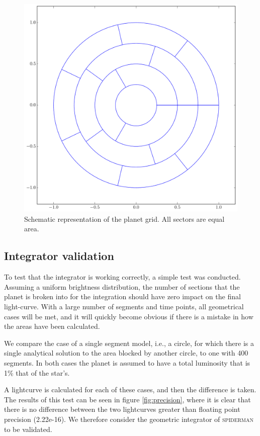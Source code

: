 \documentclass[a4paper,fleqn,usenatbib]{mnras}
\begin{document}
\begin{figure}
\begin{center}
\includegraphics[width=0.8\columnwidth]{img/frame1.pdf}
\caption{Schematic representation of the planet grid. All sectors are equal area.}
\label{fig:schematic}
\end{center}
\end{figure}

\subsection{Integrator validation}\label{sec:numerical}

To test that the integrator is working correctly, a simple test was conducted. Assuming a uniform brightness distribution, the number of sections that the planet is broken into for the integration should have zero impact on the final light-curve. With a large number of segments and time points, all geometrical cases will be met, and it will quickly become obvious if there is a mistake in how the areas have been calculated.

We compare the case of a single segment model, i.e., a circle, for which there is a single analytical solution to the area blocked by another circle, to one with 400 segments. In both cases the planet is assumed to have a total luminosity that is 1\% that of the star's.

A lightcurve is calculated for each of these cases, and then the difference is taken. The results of this test can be seen in figure \ref{fig:precision}, where it is clear that there is no difference between the two lightcurves greater than floating point precision (2.22e-16). We therefore consider the geometric integrator of \textsc{spiderman} to be validated.
\end{document}
